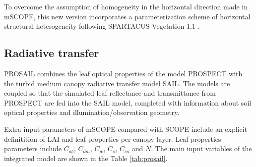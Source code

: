 \documentclass{report}
\begin{document}
To overcome the assumption of homogeneity in the horizontal direction made in mSCOPE, this new version incorporates a parameterization scheme of horizontal structural heterogeneity following SPARTACUS-Vegetation 1.1 \citep{Hogan2018}.

\subsection{Radiative transfer}




PROSAIL combines the leaf optical properties of the model PROSPECT \citep{Jacquemoud1990,Feret2017} with the turbid medium canopy radiative transfer model SAIL. The models are coupled so that the simulated leaf reflectance and transmittance from PROSPECT are fed into the SAIL model, completed with information about soil optical properties and illumination/observation geometry.

 Extra input parameters of mSCOPE compared with SCOPE include an explicit definitition of LAI and leaf properties per canopy layer. Leaf properties parameters include $C_{ab}$, $C_{dm}$, $C_{w}$, $C_{s}$, $C_{ca}$ and $N$. The main input variables of the integrated model are shown in the Table \ref{tab:prosail}.
\end{document}
